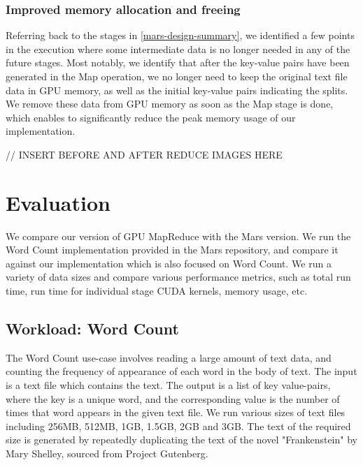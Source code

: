\documentclass{article}
\begin{document}
\subsubsection{Improved memory allocation and freeing}
Referring back to the stages in \ref{mars-design-summary}, we identified a few points in the execution where some intermediate data is no longer needed in any of the future stages. Most notably, we identify that after the key-value pairs have been generated in the Map operation, we no longer need to keep the original text file data in GPU memory, as well as the initial key-value pairs indicating the splits. We remove these data from GPU memory as soon as the Map stage is done, which enables to significantly reduce the peak memory usage of our implementation.

// INSERT BEFORE AND AFTER REDUCE IMAGES HERE

\section{Evaluation}
We compare our version of GPU MapReduce with the Mars version. We run the Word Count implementation provided in the Mars repository, and compare it against our implementation which is also focused on Word Count. We run a variety of data sizes and compare various performance metrics, such as total run time, run time for individual stage CUDA kernels, memory usage, etc.

\subsection{Workload: Word Count}
The Word Count use-case involves reading a large amount of text data, and counting the frequency of appearance of each word in the body of text. The input is a text file which contains the text. The output is a list of key value-pairs, where the key is a unique word, and the corresponding value is the number of times that word appears in the given text file. We run various sizes of text files including 256MB, 512MB, 1GB, 1.5GB, 2GB and 3GB. The text of the required size is generated by repeatedly duplicating the text of the novel "Frankenstein" by Mary Shelley, sourced from Project Gutenberg.  
\end{document}
